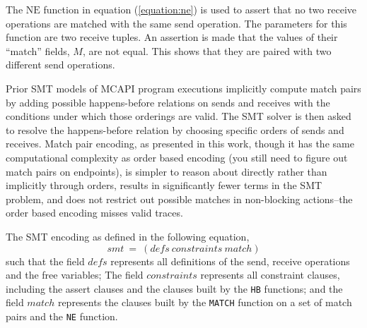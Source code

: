 
The $\mathrm{NE}$ function in equation (\ref{equation:ne}) is used to assert that no two receive operations are matched
with the same send operation. The parameters for this function are two receive
tuples. An assertion is made that the values of their ``match'' fields, $M$,
are not equal. This shows that they are paired with two different send
operations.

Prior SMT models of MCAPI program executions implicitly compute
match pairs by adding possible happens-before relations on sends and
receives with the conditions under which those orderings are
valid. The SMT solver is then asked to resolve the happens-before
relation by choosing specific orders of sends and receives. Match pair
encoding, as presented in this work, though it has the same
computational complexity as order based encoding (you still need to
figure out match pairs on endpoints), is simpler to reason about
directly rather than implicitly through orders, results in
significantly fewer terms in the SMT problem, and does not restrict
out possible matches in non-blocking actions--the order based encoding
misses valid traces.

The SMT encoding as defined in the following equation,
\[\mathit{smt}\ =\ (\mathit{defs}\ \mathit{constraints}\ \mathit{match})\]
such that the field $\mathit{defs}$ represents all definitions of the send, receive operations and the free variables; The field $\mathit{constraints}$ represents all constraint clauses, including the assert clauses and the clauses built by the \texttt{HB} functions; and the field $\mathit{match}$ represents the clauses built by the \texttt{MATCH} function on a set of match pairs and the \texttt{NE} function. %

